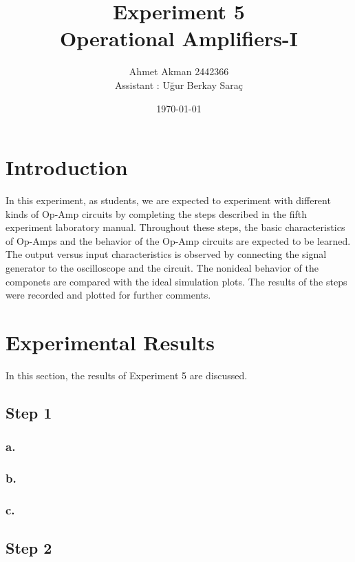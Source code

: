 \documentclass[letterpaper,12pt]{article}
\begin{document}
\title{Experiment 5 \protect\\Operational Amplifiers-I}
\author{Ahmet Akman 2442366 \protect\\ Assistant : Uğur Berkay Saraç}
\date{\today}
\maketitle


\section{Introduction} 
In this experiment, as students, we are expected to experiment with different kinds of Op-Amp circuits by completing the steps described in the fifth experiment laboratory manual. Throughout these steps, the basic characteristics of Op-Amps and the behavior of the Op-Amp circuits are expected to be learned. The output versus input characteristics is observed by connecting the signal generator to the oscilloscope and the circuit. The nonideal behavior of the componets are compared with the ideal simulation plots. The results of the steps were recorded and plotted for further comments.
\section{Experimental Results}
In this section, the results of Experiment 5 are discussed.
\subsection{Step 1}

\subsubsection{a.}
\subsubsection{b.}
\subsubsection{c.}

\subsection{Step 2}
\end{document}
